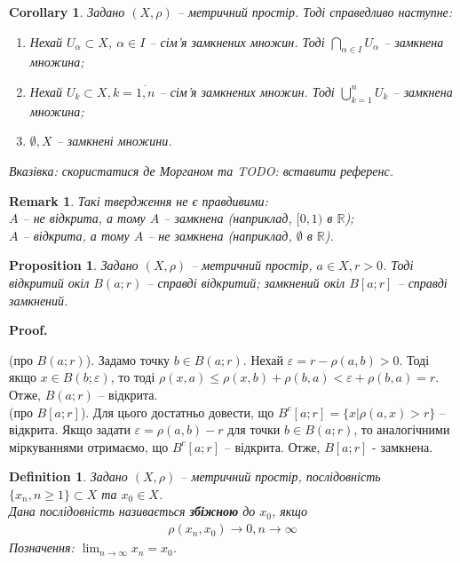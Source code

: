 \documentclass[a4paper, 10pt]{article}
\makeatletter
\theoremstyle{theoremdd}
\theoremstyle{theoremdd}
\newtheorem{definition}[theorem]{Definition}
\theoremstyle{theoremdd}
\theoremstyle{theoremdd}
\theoremstyle{theoremdd}
\newtheorem{proposition}[theorem]{Proposition}
\theoremstyle{theoremdd}
\newtheorem{remark}[theorem]{Remark}
\theoremstyle{theoremdd}
\theoremstyle{theoremdd}
\newtheorem{corollary}[theorem]{Corollary}
\renewenvironment{proof}[1][Proof.\\]{\par
\pushQED{\hfill \qed}%
\normalfont \topsep6\p@\@plus6\p@\relax
\trivlist
\item\relax
{\bfseries
#1\@addpunct{.}}\hspace\labelsep\ignorespaces
}{%
\popQED\endtrivlist\@endpefalse
}
\makeatother
\begin{document}
\begin{corollary}
Задано $(X,\rho)$ -- метричний простір. Тоді справедливо наступне:
\begin{enumerate}[nosep,wide=0pt,label={\arabic*)}]
\item Нехай $U_{\alpha} \subset X$, $\alpha \in I$ -- сім'я замкнених множин. Тоді $\displaystyle \bigcap_{\alpha \in I} U_{\alpha}$ -- замкнена множина;
\item Нехай $U_k \subset X, k = \overline{1,n}$ -- сім'я замкнених множин. Тоді $\displaystyle \bigcup_{k=1}^n U_k$ -- замкнена множина;
\item $\emptyset, X$ -- замкнені множини.
\end{enumerate}
\textit{Вказівка: скористатися де Морганом та TODO: вставити референс.}
\end{corollary}

\begin{remark} Такі твердження не є правдивими:\\
$A$ -- не відкрита, а тому $A$ -- замкнена (наприклад, $[0,1)$ в $\mathbb{R}$);\\
$A$ -- відкрита, а тому $A$ -- не замкнена (наприклад, $\emptyset$ в $\mathbb{R}$).
\end{remark}

\begin{proposition} Задано $(X,\rho)$ -- метричний простір, $a \in X, r > 0$. Тоді відкритий окіл $B(a;r)$ -- справді відкритий; замкнений окіл $B[a;r]$ -- справді замкнений.
\end{proposition}

\begin{proof}
(про $B(a;r)$). Задамо точку $b \in B(a;r)$. Нехай $\varepsilon = r - \rho(a,b) > 0$. Тоді якщо $x \in B(b; \varepsilon)$, то тоді $\rho(x, a) \leq \rho(x, b) + \rho(b, a) < \varepsilon + \rho(b,a) = r$. Отже, $B(a;r)$ -- відкрита.
\bigskip \\
(про $B[a;r]$). Для цього достатньо довести, що $B^c[a;r] = \{x | \rho(a,x) > r\}$ -- відкрита. Якщо задати $\varepsilon = \rho(a,b) - r$ для точки $b \in B(a;r)$, то аналогічними міркуваннями отримаємо, що $B^c[a;r]$ -- відкрита. Отже, $B[a;r]$ - замкнена.
\end{proof}

\begin{definition}
Задано $(X,\rho)$ -- метричний простір, послідовність $\{x_n, n \geq 1\} \subset X$ та $x_0 \in X$.\\
Дана послідовність називається \textbf{збіжною} до $x_0$, якщо
\begin{align*}
\rho(x_n, x_0) \to 0, n \to \infty
\end{align*}
Позначення: $\displaystyle\lim_{n \to \infty} x_n = x_0$.
\end{definition}
\end{document}
